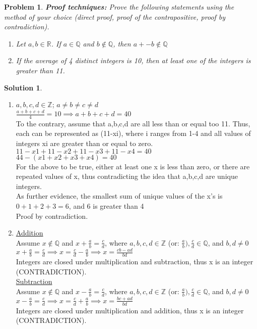 \documentclass{article}
\newtheorem{problem}{Problem}
\theoremstyle{definition}
\newtheorem*{solution}{Solution}
\begin{document}
\begin{problem}
\textbf{Proof techniques:} Prove the following statements using the method of your choice (direct proof, proof of the contrapositive, proof by contradiction).
\begin{enumerate}[label = \alph*)]
    \item Let $a,b\in \mathbb{R}$. If $a \in \mathbb{Q}$ and $b\notin \mathbb{Q}$, then $a +- b \notin \mathbb{Q}$
    
    \item If the average of 4 distinct integers is 10, then at least one of the integers is greater than 11.
\end{enumerate}
\end{problem}

\begin{solution}
\end{solution}

\begin{enumerate}[label = \alph*)]
    \item 
    $a, b, c, d \in \mathbb{Z}$; $a\neq b\neq c\neq d$\\
    $\frac{a+b+c+d}{4} = 10 \implies a+b+c+d = 40$\\
    To the contrary, assume that a,b,c,d are all less than or equal too 11. Thus, each can be represented as (11-xi), where i ranges from 1-4 and all values of integers xi are greater than or equal to zero.\\
    $11-x1+11-x2+11-x3+11-x4=40$\\
    $44-(x1+x2+x3+x4) = 40$\\
    For the above to be true, either at least one x is less than zero, or there are repeated values of x, thus contradicting the idea that a,b,c,d are unique integers.\\
    As further evidence, the smallest sum of unique values of the x's is $0+1+2+3 = 6$, and 6 is greater than 4\\
    Proof by contradiction.
    
    \item 
    \underline{Addition}\\
    Assume $x\notin \mathbb{Q}$ and $x + \frac{a}{b} = \frac {c}{d}$, where $a,b,c,d \in \mathbb{Z}$ (or: $\frac{a}{b}), \frac{c}{d} \in \mathbb{Q}$, and $b,d\neq 0$\\
    $x + \frac{a}{b} = \frac {c}{d}\implies x= \frac{c}{d} - \frac{a}{b}\implies x=\frac{cb-ad}{bd}$\\
    Integers are closed under multiplication and subtraction, thus x is an integer (CONTRADICTION).\\
    \underline{Subtraction}\\
    Assume $x\notin \mathbb{Q}$ and $x - \frac{a}{b} = \frac {c}{d}$, where $a,b,c,d \in \mathbb{Z}$ (or: $\frac{a}{b}), \frac{c}{d} \in \mathbb{Q}$, and $b,d\neq 0$\\
    $x-\frac{a}{b} = \frac{c}{d} \implies x= \frac{c}{d} + \frac{a}{b} \implies x=\frac{bc+ad}{bd}$\\
    Integers are closed under multiplication and addition, thus x is an integer (CONTRADICTION).
\end{enumerate}
\end{document}
